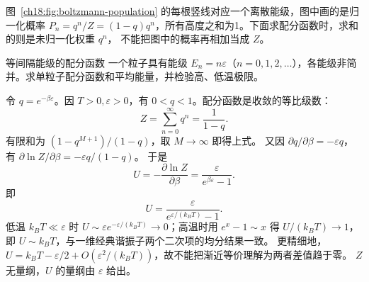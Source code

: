 \begin{center}\begin{minipage}{\linewidth}\centering
{}
\label{ch18:fig:boltzmann-population}
\end{minipage}\end{center}
图~\ref{ch18:fig:boltzmann-population} 的每根竖线对应一个离散能级，图中画的是归一化概率
$P_n=q^n/Z=(1-q)q^n$，所有高度之和为1。下面求配分函数时，求和的则是未归一化权重 $q^n$，
不能把图中的概率再相加当成 $Z$。

\begin{origexamplebox}{等间隔能级的配分函数}
一个粒子具有能级 $E_n=n\varepsilon$（$n=0,1,2,\ldots$），各能级非简并。求单粒子配分函数和平均能量，并检验高、低温极限。

\StatQLadder
\end{origexamplebox}
\begin{xesolution}
令 $q=e^{-\beta\varepsilon}$。因 $T>0,\varepsilon>0$，有 $0<q<1$。配分函数是收敛的等比级数：
\[
 Z=\sum_{n=0}^\infty q^n=\frac1{1-q}.
\]
有限和为 $(1-q^{M+1})/(1-q)$，取 $M\to\infty$ 即得上式。
又因 $\partial q/\partial\beta=-\varepsilon q$，有
$\partial\ln Z/\partial\beta=-\varepsilon q/(1-q)$。
于是
\[
 U=-\frac{\partial\ln Z}{\partial\beta}
 =\frac{\varepsilon}{e^{\beta\varepsilon}-1}.
\]
即
\[
 \boxed{U=\frac{\varepsilon}{e^{\varepsilon/(k_BT)}-1}}.
\]
低温 $k_BT\ll\varepsilon$ 时 $U\sim\varepsilon e^{-\varepsilon/(k_BT)}\to0$；高温时用
$e^x-1\sim x$ 得 $U/(k_BT)\to1$，即 $U\sim k_BT$，与一维经典谐振子两个二次项的均分结果一致。
更精细地，$U=k_BT-\varepsilon/2+O(\varepsilon^2/(k_BT))$，故不能把渐近等价理解为两者差值趋于零。
$Z$ 无量纲，$U$ 的量纲由 $\varepsilon$ 给出。

\StatALadder
\end{xesolution}


